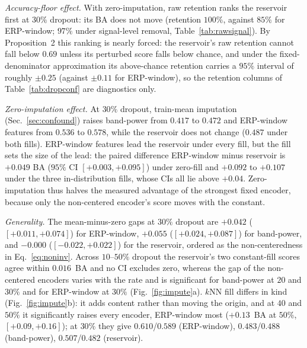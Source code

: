 \documentclass[conference]{IEEEtran}
\begin{document}
\emph{Accuracy-floor effect.} With zero-imputation, raw retention ranks the reservoir first at $30\%$ dropout: its BA does not move (retention $100\%$, against $85\%$ for ERP-window; $97\%$ under signal-level removal, Table~\ref{tab:rawsignal}). By Proposition~2 this ranking is nearly forced: the reservoir's raw retention cannot fall below $0.69$ unless its perturbed score falls below chance, and under the fixed-denominator approximation its above-chance retention carries a $95\%$ interval of roughly $\pm0.25$ (against $\pm0.11$ for ERP-window), so the retention columns of Table~\ref{tab:dropconf} are diagnostics only.

\emph{Zero-imputation effect.} At $30\%$ dropout, train-mean imputation (Sec.~\ref{sec:confound}) raises band-power from $0.417$ to $0.472$ and ERP-window features from $0.536$ to $0.578$, while the reservoir does not change ($0.487$ under both fills). ERP-window features lead the reservoir under every fill, but the fill sets the size of the lead: the paired difference ERP-window minus reservoir is $+0.049$ BA ($95\%$ CI $[+0.003,+0.095]$) under zero-fill and $+0.092$ to $+0.107$ under the three in-distribution fills, whose CIs all lie above $+0.04$. Zero-imputation thus halves the measured advantage of the strongest fixed encoder, because only the non-centered encoder's score moves with the constant.

\emph{Generality.} The mean-minus-zero gaps at $30\%$ dropout are $+0.042$ ($[+0.011,+0.074]$) for ERP-window, $+0.055$ ($[+0.024,+0.087]$) for band-power, and $-0.000$ ($[-0.022,+0.022]$) for the reservoir, ordered as the non-centeredness in Eq.~\eqref{eq:noninv}. Across $10$--$50\%$ dropout the reservoir's two constant-fill scores agree within $0.016$~BA and no CI excludes zero, whereas the gap of the non-centered encoders varies with the rate and is significant for band-power at $20$ and $30\%$ and for ERP-window at $30\%$ (Fig.~\ref{fig:impute}a). $k$NN fill differs in kind (Fig.~\ref{fig:impute}b): it adds content rather than moving the origin, and at $40$ and $50\%$ it significantly raises every encoder, ERP-window most ($+0.13$~BA at $50\%$, $[+0.09,+0.16]$); at $30\%$ they give $0.610$/$0.589$ (ERP-window), $0.483$/$0.488$ (band-power), $0.507$/$0.482$ (reservoir).
\end{document}
